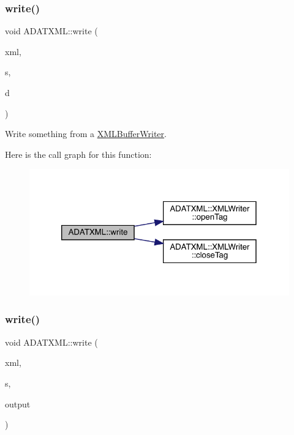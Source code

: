 \subsubsection{\texorpdfstring{write()}{write()}\hspace{0.1cm}{\footnotesize\ttfamily [2/58]}}
{\footnotesize\ttfamily void A\+D\+A\+T\+X\+M\+L\+::write (\begin{DoxyParamCaption}\item[{\mbox{\hyperlink{classADATXML_1_1XMLWriter}{X\+M\+L\+Writer}} \&}]{xml,  }\item[{const std\+::string \&}]{s,  }\item[{const \mbox{\hyperlink{classADATXML_1_1XMLBufferWriter}{X\+M\+L\+Buffer\+Writer}} \&}]{d }\end{DoxyParamCaption})}



Write something from a \mbox{\hyperlink{classADATXML_1_1XMLBufferWriter}{X\+M\+L\+Buffer\+Writer}}. 

Here is the call graph for this function\+:\nopagebreak
\begin{figure}[H]
\begin{center}
\leavevmode
\includegraphics[width=320pt]{d2/da3/group__io_ga14c568a7a3ffb3e486c9036ff7382f8e_cgraph}
\end{center}
\end{figure}
\mbox{\label{group__io_ga20a076b653822e9476b7712de61b383c}} 
\subsubsection{\texorpdfstring{write()}{write()}\hspace{0.1cm}{\footnotesize\ttfamily [3/58]}}
{\footnotesize\ttfamily void A\+D\+A\+T\+X\+M\+L\+::write (\begin{DoxyParamCaption}\item[{\mbox{\hyperlink{classADATXML_1_1XMLWriter}{X\+M\+L\+Writer}} \&}]{xml,  }\item[{const std\+::string \&}]{s,  }\item[{const std\+::string \&}]{output }\end{DoxyParamCaption})}

